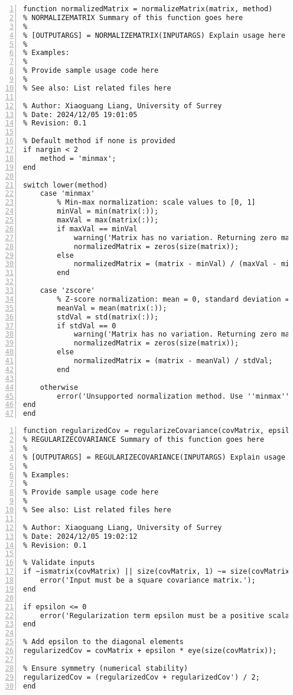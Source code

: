 \documentclass{article}
\begin{document}
\begin{lstlisting}[frame=single, numbers=left, style=Matlab-editor, caption={normalizeMatrix.m}, label={lst:normalizeMatrix}]
  function normalizedMatrix = normalizeMatrix(matrix, method)
% NORMALIZEMATRIX Summary of this function goes here
%
% [OUTPUTARGS] = NORMALIZEMATRIX(INPUTARGS) Explain usage here
%
% Examples:
%
% Provide sample usage code here
%
% See also: List related files here

% Author: Xiaoguang Liang, University of Surrey
% Date: 2024/12/05 19:01:05
% Revision: 0.1

% Default method if none is provided
if nargin < 2
    method = 'minmax';
end

switch lower(method)
    case 'minmax'
        % Min-max normalization: scale values to [0, 1]
        minVal = min(matrix(:));
        maxVal = max(matrix(:));
        if maxVal == minVal
            warning('Matrix has no variation. Returning zero matrix.');
            normalizedMatrix = zeros(size(matrix));
        else
            normalizedMatrix = (matrix - minVal) / (maxVal - minVal);
        end

    case 'zscore'
        % Z-score normalization: mean = 0, standard deviation = 1
        meanVal = mean(matrix(:));
        stdVal = std(matrix(:));
        if stdVal == 0
            warning('Matrix has no variation. Returning zero matrix.');
            normalizedMatrix = zeros(size(matrix));
        else
            normalizedMatrix = (matrix - meanVal) / stdVal;
        end

    otherwise
        error('Unsupported normalization method. Use ''minmax'' or ''zscore''.');
end
end

\end{lstlisting}

\begin{lstlisting}[frame=single, numbers=left, style=Matlab-editor, caption={regularizeCovariance.m}, label={lst:regularizeCovariance}]
  function regularizedCov = regularizeCovariance(covMatrix, epsilon)
% REGULARIZECOVARIANCE Summary of this function goes here
%
% [OUTPUTARGS] = REGULARIZECOVARIANCE(INPUTARGS) Explain usage here
%
% Examples:
%
% Provide sample usage code here
%
% See also: List related files here

% Author: Xiaoguang Liang, University of Surrey
% Date: 2024/12/05 19:02:12
% Revision: 0.1

% Validate inputs
if ~ismatrix(covMatrix) || size(covMatrix, 1) ~= size(covMatrix, 2)
    error('Input must be a square covariance matrix.');
end

if epsilon <= 0
    error('Regularization term epsilon must be a positive scalar.');
end

% Add epsilon to the diagonal elements
regularizedCov = covMatrix + epsilon * eye(size(covMatrix));

% Ensure symmetry (numerical stability)
regularizedCov = (regularizedCov + regularizedCov') / 2;
end

\end{lstlisting}
\end{document}
